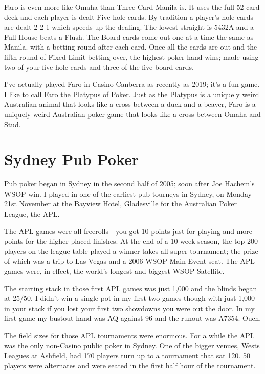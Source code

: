 Faro is even more like Omaha than Three-Card Manila is. It uses the full
52-card deck and each player is dealt Five hole cards. By tradition a
player's hole cards are dealt 2-2-1 which speeds up the dealing. The lowest
straight is 5432A and a Full House beats a Flush. The Board
cards come out one at a time the same as Manila. with a betting round
after each card. Once all the cards are out and the fifth round of
Fixed Limit betting over, the highest poker hand wins; made using two
of your five hole cards and three of the five board cards.

I've actually played Faro in Casino Canberra as recently as 2019; it's a
fun game. I like to call Faro the Platypus of Poker. Just as the
Platypus is a uniquely weird Australian animal that looks like
a cross between a duck and a beaver, Faro is a uniquely weird
Australian poker game that looks like a cross between Omaha and Stud.

\section{Sydney Pub Poker}

Pub poker began in Sydney in the second half of 2005; soon after Joe
Hachem's WSOP win. I played in one of the earliest pub tourneys
in Sydney, on Monday 21st November at the Bayview Hotel, Gladesville
for the Australian Poker League, the APL.

The APL games were all freerolls - you got 10 points just for
playing and more points for the higher placed finishes. At the
end of a 10-week season, the top 200 players on the league table
played a winner-takes-all super tournament; the prize of which was a
trip to Las Vegas and a 2006 WSOP Main Event seat. The APL games were,
in effect, the world's longest and biggest WSOP Satellite.

The starting stack in those first APL games was just 1,000 and the blinds
began at 25/50. I didn't win a single pot in my first two
games though with just 1,000 in your stack if you lost your first two
showdowns you were out the door. In my first game my bustout hand was
AQ against 96 and the runout was A7354. Ouch.

The field sizes for those APL tournaments were enormous. For a while
the APL was the only non-Casino public poker in Sydney. One of the bigger
venues, Wests Leagues at Ashfield, had 170 players turn up to a
tournament that sat 120. 50 players were alternates and were seated in
the first half hour of the tournament.

